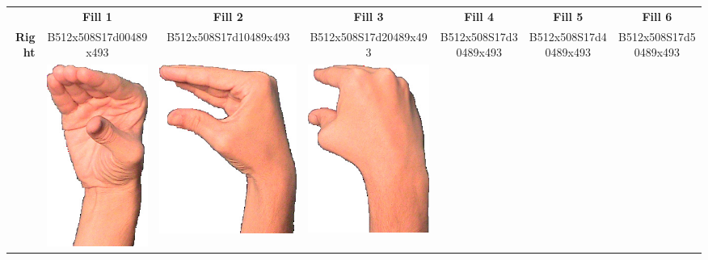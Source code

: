 \documentclass{article}
\begin{document}
\begin{center}
\begin{tabular}{r*{6}{c}}
&\textbf{Fill 1}&\textbf{Fill 2}&\textbf{Fill 3}&\textbf{Fill 4}&\textbf{Fill 5}&\textbf{Fill 6}\\
\multirow{2}{*}{\textbf{Right}}&
B512x508S17d00489x493&
B512x508S17d10489x493&
B512x508S17d20489x493&
B512x508S17d30489x493&
B512x508S17d40489x493&
B512x508S17d50489x493\\
&
\includegraphics[scale=0.1]{images/05-18-1.jpg}&
\includegraphics[scale=0.1]{images/05-18-2.jpg}&
\includegraphics[scale=0.1]{images/05-18-3.jpg}&

\end{tabular}
\end{center}
\end{document}
